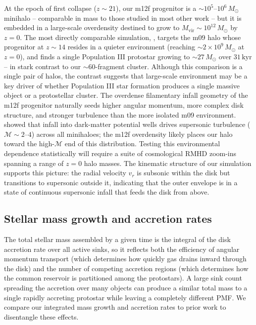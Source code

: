 \documentclass[twocolumn]{openjournal}
\newcommand{\Msun}{M_\odot}
\newcommand{\kyr}{\,\mathrm{kyr}}
\begin{document}
At the epoch of first collapse ($z \sim 21$), our m12f progenitor is
a $\sim 10^5$--$10^6\,\Msun$ minihalo -- comparable in mass to those
studied in most other work -- but it is embedded in a large-scale
overdensity destined to grow to $M_\mathrm{vir} \sim 10^{12}\,\Msun$
by $z = 0$.
The most directly comparable simulation, \citet{meziani26}, targets
the m09 halo whose progenitor at $z \sim 14$ resides in a quieter
environment (reaching $\sim 2 \times 10^9\,\Msun$ at $z = 0$),
and finds a single Population III protostar growing to
$\sim 27\,\Msun$ over $31\kyr$ -- in stark contrast to our
$\sim 60$-fragment cluster.
Although this comparison is a single pair of halos, the contrast
suggests that large-scale environment may be a key driver of whether
Population III star formation produces a single massive object or a
protostellar cluster.
The overdense filamentary infall geometry of the m12f progenitor
naturally seeds higher angular momentum, more complex disk structure,
and stronger turbulence than the more isolated m09 environment.
\citet{ho25} showed that infall into dark-matter potential wells
drives supersonic turbulence ($\mathcal{M} \sim 2$--$4$) across all
minihaloes; the m12f overdensity likely places our halo toward the
high-$\mathcal{M}$ end of this distribution.
Testing this environmental dependence statistically will require a
suite of cosmological RMHD zoom-ins spanning a range of $z=0$ halo
masses.
The kinematic structure of our simulation supports this picture: the
radial velocity $v_r$ is subsonic within the disk but transitions to
supersonic outside it, indicating that the outer envelope is in a
state of continuous supersonic infall that feeds the disk from above.

\subsection{Stellar mass growth and accretion rates}

The total stellar mass assembled by a given time is the integral of the disk accretion rate over all active sinks, so it reflects both the efficiency of angular momentum transport (which determines how quickly gas drains inward through the disk) and the number of competing accretion regions (which determines how the common reservoir is partitioned among the protostars).
A large sink count spreading the accretion over many objects can produce a similar total mass to a single rapidly accreting protostar while leaving a completely different PMF.
We compare our integrated mass growth and accretion rates to prior work to disentangle these effects.
\end{document}
